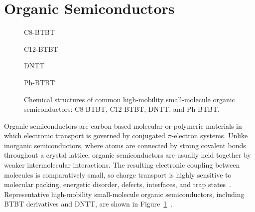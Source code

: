 
\section{Organic Semiconductors}
\label{sec:organic_semiconductors}

\begin{figure}[h]
    \centering
    \begin{minipage}{0.48\textwidth}
        \centering
        \resizebox{0.95\linewidth}{!}{}\par
        \vspace{0.5em}
        C8-BTBT
    \end{minipage}\hfill
    \begin{minipage}{0.48\textwidth}
        \centering
        \resizebox{0.95\linewidth}{!}{}\par
        \vspace{0.5em}
        C12-BTBT
    \end{minipage}

    \vspace{1em}

    \begin{minipage}{0.4\textwidth}
        \centering
        \resizebox{0.95\linewidth}{!}{}\par
        \vspace{0.5em}
        DNTT
    \end{minipage}\hspace{18mm}
    \begin{minipage}{0.4\textwidth}
        \centering
        \resizebox{0.95\linewidth}{!}{}\par
        \vspace{0.5em}
        Ph-BTBT
    \end{minipage}
    \caption[Chemical structures of common organic semiconductors]{Chemical
    structures of common high-mobility small-molecule organic semiconductors:
    C8-BTBT, C12-BTBT, DNTT, and Ph-BTBT.}
    \label{fig:organic_semiconductor_examples}
\end{figure}

Organic semiconductors are carbon-based molecular or polymeric materials in
which electronic transport is governed by conjugated $\pi$-electron systems.
Unlike inorganic semiconductors, where atoms are connected by strong covalent
bonds throughout a crystal lattice, organic semiconductors are usually held
together by weaker intermolecular interactions. The resulting electronic
coupling between molecules is comparatively small, so charge transport is highly
sensitive to molecular packing, energetic disorder, defects, interfaces, and trap
states~\cite{Bruetting2005,Coropceanu2007ChargeTransport}. Representative high-mobility small-molecule organic semiconductors, including
BTBT derivatives and DNTT, are shown in
Figure~\ref{fig:organic_semiconductor_examples}~\cite{Wang2017LowVoltageC8BTBT,Sirringhaus2005DevicePhysics}.

